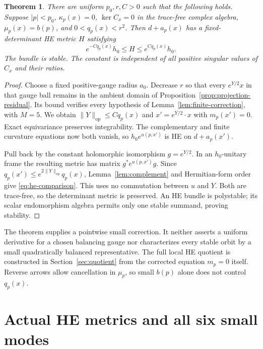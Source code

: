\documentclass[11pt]{amsart}
\newtheorem{theorem}{Theorem}[section]
\theoremstyle{definition}
\theoremstyle{remark}
\newcommand{\op}{\operatorname{op}}
\begin{document}
\begin{theorem}\label{thm:calibration}
There are uniform $p_0,r,C>0$ such that the following holds.
Suppose $|p|<p_0$, $\kappa_p(x)=0$, $\ker C_x=0$ in the
trace-free complex algebra, $\mu_p(x)=b(p)$, and
$0<q_p(x)<r^2$. Then $d+a_p(x)$ has a fixed-determinant HE metric
$H$ satisfying
\begin{equation}\label{eq:he-comparison}
 e^{-Cq_p(x)}h_0\le H\le e^{Cq_p(x)}h_0.
\end{equation}
The bundle is stable. The constant is independent of all positive
singular values of $C_x$ and their ratios.
\end{theorem}
\begin{proof}
Choose a fixed positive-gauge radius $a_0$. Decrease $r$ so that
every $e^{Y/2}x$ in that gauge ball remains in the ambient domain of
Proposition~\ref{prop:projection-residual}. Its bound verifies every
hypothesis of Lemma~\ref{lem:finite-correction}, with $M=5$.
We obtain $\|Y\|_{\op}\le Cq_p(x)$ and
$x'=e^{Y/2}\cdot x$ with $m_p(x')=0$. Exact equivariance preserves
integrability. The complementary and finite curvature equations now
both vanish, so $h_0e^{u(p,x')}$ is HE on $d+a_p(x')$.

Pull back by the constant holomorphic isomorphism $g=e^{Y/2}$.
In an $h_0$-unitary frame the resulting metric has matrix
$g^*e^{u(p,x')}g$. Since
$q_p(x')\le e^{2\|Y\|_{\op}}q_p(x)$, Lemma~\ref{lem:complement}
and Hermitian-form order give \eqref{eq:he-comparison}.
This uses no commutation between $u$ and $Y$.
Both are trace-free, so the determinant metric is preserved.
An HE bundle is polystable; its scalar endomorphism algebra permits
only one stable summand, proving stability.
\end{proof}

The theorem supplies a pointwise small correction. It neither asserts a
uniform derivative for a chosen balancing gauge nor characterizes every
stable orbit by a small quadratically balanced representative. The full
local HE quotient is constructed in Section~\ref{sec:quotient} from the
corrected equation $m_p=0$ itself. Reverse arrows allow cancellation in
$\mu_p$, so small $b(p)$ alone does not control $q_p(x)$.

\section{Actual HE metrics and all six small modes}\label{sec:balanced-family}
\end{document}
